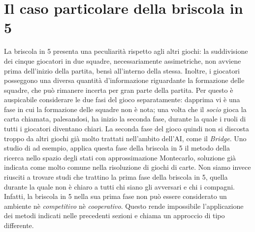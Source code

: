 \section{Il caso particolare della briscola in 5}

La briscola in 5 presenta una peculiarità rispetto agli altri giochi: la suddivisione dei cinque giocatori in due squadre, necessariamente assimetriche, non avviene prima dell'inizio della partita, bensì all'interno della stessa.
Inoltre, i giocatori posseggono una diversa quantità d'informazione riguardante la formazione delle squadre, che può rimanere incerta per gran parte della partita.
Per questo è auspicabile considerare le due fasi del gioco separatamente: dapprima vi è una fase in cui la formazione delle squadre non è nota; una volta che il \emph{socio} gioca la carta chiamata, palesandosi, ha inizio la seconda fase, durante la quale i ruoli di tutti i giocatori diventano chiari.
La seconda fase del gioco quindi non si discosta troppo da altri giochi già molto trattati nell'ambito dell'AI, come il \emph{Bridge}.
Uno studio di \cite{villa} ad esempio, applica questa fase della briscola in 5 il metodo della ricerca nello spazio degli stati con approssimazione Montecarlo, soluzione già indicata come molto comune nella risoluzione di giochi di carte.
Non siamo invece riusciti a trovare studi che trattino la prima fase della briscola in 5, quella durante la quale non è chiaro a tutti chi siano gli avversari e chi i compagni.
Infatti, la briscola in 5 nella sua prima fase non può essere considerato un ambiente nè \emph{competitivo} nè \emph{cooperativo}.
Questo rende impossibile l'applicazione dei metodi indicati nelle precedenti sezioni e chiama un approccio di tipo differente.

